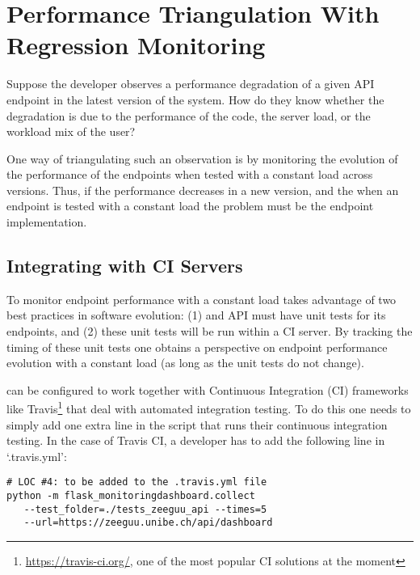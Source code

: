 


  \section{Performance Triangulation With Regression Monitoring}

  Suppose the developer observes a performance degradation of a given API endpoint in the latest version of the system. How do they know whether the degradation is due to the performance of the code, the server load, or the workload mix of the user? 

  \vspace{0.1cm}

  
  One way of triangulating such an observation is by monitoring the evolution of the performance of the endpoints when tested with a constant load across versions. Thus, if the performance decreases in a new version, and the  when an endpoint is tested with a constant load the problem must be the endpoint implementation. 

  \subsection*{Integrating with CI Servers}

  To monitor endpoint performance with a constant load \tool takes advantage of two best practices in software evolution: (1) and API must have unit tests for its endpoints, and (2) these unit tests will be run within a CI server. By tracking the timing of these unit tests one obtains a perspective on endpoint performance evolution with a constant load (as long as the unit tests do not change). 

  \tool can be configured to work together with Continuous Integration (CI) frameworks like Travis\footnote{\url{https://travis-ci.org/}, one of the most popular CI solutions at the moment} that deal with automated integration testing. To do this one needs to simply add one extra line in the script that runs their continuous integration testing. In the case of Travis CI, a developer has to add the following line in `.travis.yml': 


  \begin{lstlisting}[style=custompython]  
# LOC #4: to be added to the .travis.yml file
python -m flask_monitoringdashboard.collect
   --test_folder=./tests_zeeguu_api --times=5 
   --url=https://zeeguu.unibe.ch/api/dashboard

  \end{lstlisting}

